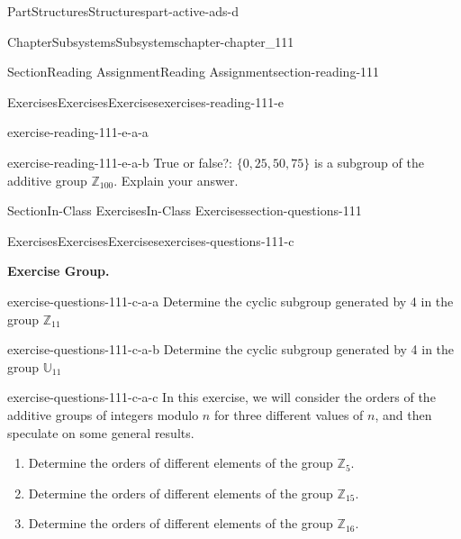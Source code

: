 \documentclass[oneside,10pt,]{book}
\numberwithin{equation}{section}
\begin{document}
\begin{partptx}{Part}{Structures}{}{Structures}{}{}{part-active-ads-d}
\begin{chapterptx}{Chapter}{Subsystems}{}{Subsystems}{}{}{chapter-chapter_111}
\begin{sectionptx}{Section}{Reading Assignment}{}{Reading Assignment}{}{}{section-reading-111}
\begin{exercises-subsection-numberless}{Exercises}{Exercises}{}{Exercises}{}{}{exercises-reading-111-e}
\begin{exercisegroup}
\begin{divisionexerciseeg}{1}{}{}{exercise-reading-111-e-a-a}
\end{divisionexerciseeg}%
\begin{divisionexerciseeg}{2}{}{}{exercise-reading-111-e-a-b}%
True or false?: \(\{0,25,50,75\}\) is a subgroup of the additive group \(\mathbb{Z}_{100}\). Explain your answer.%
\end{divisionexerciseeg}%
\end{exercisegroup}
\par\medskip\noindent
\end{exercises-subsection-numberless}
\end{sectionptx}
%
%
\typeout{************************************************}
\typeout{************************************************}
%
\begin{sectionptx}{Section}{In-Class Exercises}{}{In-Class Exercises}{}{}{section-questions-111}
%
%
%
\typeout{************************************************}
\typeout{************************************************}
%
\begin{exercises-subsection-numberless}{Exercises}{Exercises}{}{Exercises}{}{}{exercises-questions-111-c}
\par\medskip\noindent%
\textbf{Exercise Group.}\space\space%
\begin{exercisegroup}
\begin{divisionexerciseeg}{1}{}{}{exercise-questions-111-c-a-a}%
Determine the cyclic subgroup generated by 4 in the group \(\mathbb{Z}_{11}\)%
\end{divisionexerciseeg}%
\begin{divisionexerciseeg}{2}{}{}{exercise-questions-111-c-a-b}%
Determine the cyclic subgroup generated by 4 in the group \(\mathbb{U}_{11}\)%
\end{divisionexerciseeg}%
\begin{divisionexerciseeg}{3}{}{}{exercise-questions-111-c-a-c}%
In this exercise, we will consider the orders of the additive groups of integers modulo \(n\) for three different values of \(n\), and then speculate on some general results.%
\begin{enumerate}[label=(\alph*)]
\item{}Determine the orders of different elements of the group \(\mathbb{Z}_{5}\).%
\item{}Determine the orders of different elements of the group \(\mathbb{Z}_{15}\).%
\item{}Determine the orders of different elements of the group \(\mathbb{Z}_{16}\).%

\end{enumerate}
\end{divisionexerciseeg}
\end{exercisegroup}
\end{exercises-subsection-numberless}
\end{sectionptx}
\end{chapterptx}
\end{partptx}
\end{document}
